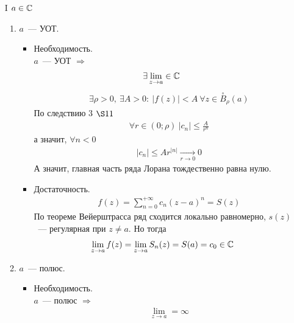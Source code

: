 \pr
\begin{itemize}
    \item[I] $a \in \mathbb{C}$
    \begin{enumerate}
        \item $a$~--- УОТ.
        \begin{itemize}
            \item Необходимость.
            \\
            $a$~--- УОТ $\Rightarrow$
            \begin{align*}
              & \exists \lim_{z \to a} \in \mathbb{C}
            \end{align*}
            \begin{align*}
              & \exists \rho > 0, \ \exists A > 0: \ \left| f(z) \right| < A \ \forall z \in \overset{\circ}{B}_{\rho}(a)
            \end{align*}
            По следствию $3$ $\S 11$
            \begin{align*}
              & \forall r \in (0;\rho) \ \left| c_n \right| \leq \frac{A}{r^n}
            \end{align*}
            а значит, $\forall n < 0$
            \begin{align*}
              & \left| c_n \right| \leq Ar^{\left| n \right|} \underset{r\to 0}{\longrightarrow} 0
            \end{align*}
            А значит, главная часть ряда Лорана тождественно равна нулю.
            \item Достаточность.
            \begin{align*}
              & f(z) = \sum_{n=0}^{+\infty}c_n(z-a)^n = S(z)
            \end{align*}
            По теореме Вейерштрасса ряд сходится локально равномерно, $s(z)$~---
            регулярная при $z \neq a$. Но тогда
            \begin{align*}
              & \lim_{z \to a}f(z) = \lim_{z \to a}S_n(z) = S(a) = c_0 \in \mathbb{C}
            \end{align*}
        \end{itemize}
        \item $a$~--- полюс.
        \begin{itemize}
            \item Необходимость.
            \\
            $a$~--- полюс $\Rightarrow$
            \begin{align*}
              & \lim_{z \to a} = \infty
            \end{align*}

\end{itemize}
\end{enumerate}
\end{itemize}
